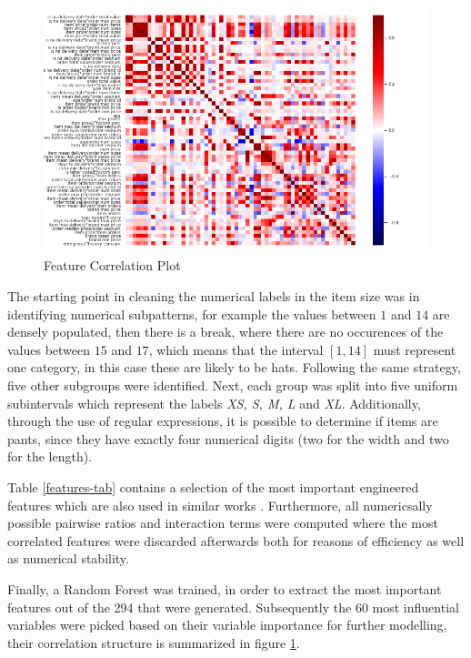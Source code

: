 \begin{figure}[ht]
\centering
\caption{Feature Correlation Plot}
\label{corrplot}
\includegraphics[scale=0.4]{../eda/corrplot.png}
\end{figure}


The starting point in cleaning the numerical labels in the item size was in identifying numerical subpatterns, for example the values between $1$ and $14$  are densely populated, then there is a break, where there are no occurences of the values between $15$ and $17$, which means that the interval $[1, 14]$ must represent one category, in this case these are likely to be hats. Following the same strategy, five other subgroups were identified. Next, each group was split into five uniform subintervals which represent the labels \emph{XS, S, M, L} and \emph{XL}. Additionally, through the use of regular expressions, it is possible to determine if items are pants, since they have exactly four numerical digits (two for the width and two for the length).

Table \ref{features-tab} contains a selection of the most important engineered features which are also used in similar works \cite{features}. Furthermore, all numericsally possible pairwise ratios and interaction terms were computed where the most correlated features were discarded afterwards both for reasons of efficiency as well as numerical stability.

Finally, a Random Forest was trained, in order to extract the most important features out of the 294 that were generated. Subsequently the 60 most influential variables were picked based on their variable importance for further modelling, their correlation structure is summarized in figure \ref{corrplot}.